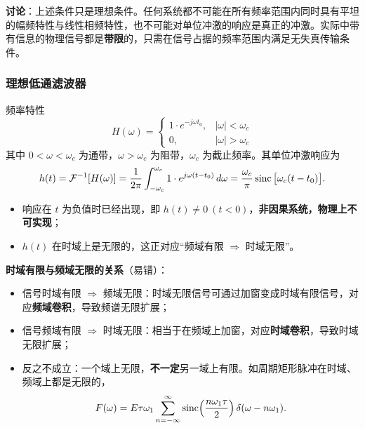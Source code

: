 \textbf{讨论}：上述条件只是理想条件。任何系统都不可能在所有频率范围内同时具有平坦的幅频特性与线性相频特性，也不可能对单位冲激的响应是真正的冲激。实际中带有信息的物理信号都是\textbf{带限}的，只需在信号占据的频率范围内满足无失真传输条件。

\subsubsection{理想低通滤波器}
频率特性
\begin{equation}
H(\omega)=\begin{cases}1\cdot e^{-j\omega t_0}, & |\omega|<\omega_c\\[2pt] 0, & |\omega|>\omega_c\end{cases}
\end{equation}
其中 $0<\omega<\omega_c$ 为通带，$\omega>\omega_c$ 为阻带，$\omega_c$ 为截止频率。其单位冲激响应为
\begin{equation}
h(t)=\mathcal{F}^{-1}[H(\omega)]=\frac{1}{2\pi}\int_{-\omega_c}^{\omega_c}1\cdot e^{j\omega(t-t_0)}\,d\omega=\frac{\omega_c}{\pi}\operatorname{sinc}\big[\omega_c(t-t_0)\big].
\end{equation}
\begin{itemize}
\item 响应在 $t$ 为负值时已经出现，即 $h(t)\ne 0\ (t<0)$，\textbf{非因果系统，物理上不可实现}；
\item $h(t)$ 在时域上是无限的，这正对应“频域有限 $\Rightarrow$ 时域无限”。
\end{itemize}

\textbf{时域有限与频域无限的关系}（易错）：
\begin{itemize}
\item 信号时域有限 $\Rightarrow$ 频域无限：时域无限信号可通过加窗变成时域有限信号，对应\textbf{频域卷积}，导致频谱无限扩展；
\item 信号频域有限 $\Rightarrow$ 时域无限：相当于在频域上加窗，对应\textbf{时域卷积}，导致时域无限扩展；
\item 反之不成立：一个域上无限，\textbf{不一定}另一域上有限。如周期矩形脉冲在时域、频域上都是无限的，
\begin{equation}
F(\omega)=E\tau\omega_1\sum_{n=-\infty}^{\infty}\operatorname{sinc}\!\left(\frac{n\omega_1\tau}{2}\right)\delta(\omega-n\omega_1).
\end{equation}
\end{itemize}

